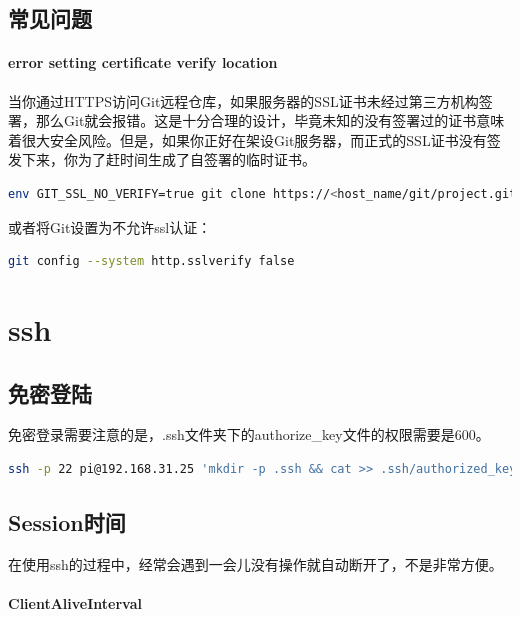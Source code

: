 \documentclass[letter]{book}
\begin{document}
\subsection{常见问题}


\paragraph{error setting certificate verify location}

当你通过HTTPS访问Git远程仓库，如果服务器的SSL证书未经过第三方机构签署，那么Git就会报错。这是十分合理的设计，毕竟未知的没有签署过的证书意味着很大安全风险。但是，如果你正好在架设Git服务器，而正式的SSL证书没有签发下来，你为了赶时间生成了自签署的临时证书。

\begin{lstlisting}[language=Bash]
env GIT_SSL_NO_VERIFY=true git clone https://<host_name/git/project.git
\end{lstlisting}

或者将Git设置为不允许ssl认证：


\begin{lstlisting}[language=Bash]
git config --system http.sslverify false
\end{lstlisting}


\section{ssh}

\subsection{免密登陆}

免密登录需要注意的是，.ssh文件夹下的authorize\_key文件的权限需要是600。

\begin{lstlisting}[language=Bash]
ssh -p 22 pi@192.168.31.25 'mkdir -p .ssh && cat >> .ssh/authorized_keys' < ~/.ssh/id_rsa.pub
\end{lstlisting}

\subsection{Session时间}

在使用ssh的过程中，经常会遇到一会儿没有操作就自动断开了，不是非常方便。

\paragraph{ClientAliveInterval}
\end{document}
